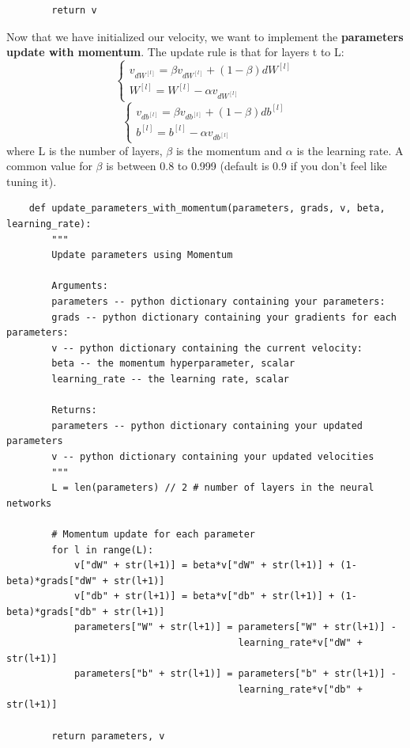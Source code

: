 \documentclass[11pt, a4paper]{article}
\begin{document}
\begin{spacing}{1.1}
\begin{lstlisting}
		return v \end{lstlisting} \vspace*{1mm}
	Now that we have initialized our velocity, we want to implement the \textbf{parameters update with momentum}. The update rule is that for layers t to L: $$ \begin{cases}
	v_{dW^{[l]}} = \beta v_{dW^{[l]}} + (1 - \beta) dW^{[l]} \\
	W^{[l]} = W^{[l]} - \alpha v_{dW^{[l]}}
	\end{cases}$$	
	$$\begin{cases}
	v_{db^{[l]}} = \beta v_{db^{[l]}} + (1 - \beta) db^{[l]} \\
	b^{[l]} = b^{[l]} - \alpha v_{db^{[l]}} 
	\end{cases}$$
	where L is the number of layers, $\beta$ is the momentum and $\alpha$ is the learning rate. A common value for $\beta$ is between 0.8 to 0.999 (default is 0.9 if you don't feel like tuning it). 
	\begin{lstlisting}
	def update_parameters_with_momentum(parameters, grads, v, beta, learning_rate):
		"""
		Update parameters using Momentum
		
		Arguments:
		parameters -- python dictionary containing your parameters:
		grads -- python dictionary containing your gradients for each parameters:
		v -- python dictionary containing the current velocity:
		beta -- the momentum hyperparameter, scalar
		learning_rate -- the learning rate, scalar
		
		Returns:
		parameters -- python dictionary containing your updated parameters 
		v -- python dictionary containing your updated velocities
		"""
		L = len(parameters) // 2 # number of layers in the neural networks
		
		# Momentum update for each parameter
		for l in range(L):
			v["dW" + str(l+1)] = beta*v["dW" + str(l+1)] + (1-beta)*grads["dW" + str(l+1)]
			v["db" + str(l+1)] = beta*v["db" + str(l+1)] + (1-beta)*grads["db" + str(l+1)]
			parameters["W" + str(l+1)] = parameters["W" + str(l+1)] - 
			                             learning_rate*v["dW" + str(l+1)]
			parameters["b" + str(l+1)] = parameters["b" + str(l+1)] - 
			                             learning_rate*v["db" + str(l+1)]
	
		return parameters, v \end{lstlisting} \newpage


\end{spacing}
\end{document}
